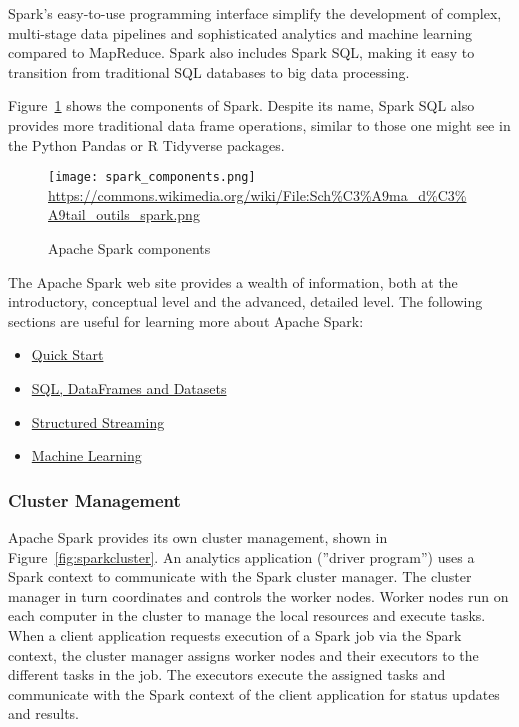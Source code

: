 Spark's easy-to-use programming interface simplify the development of complex, multi-stage data pipelines and sophisticated analytics and machine learning compared to MapReduce. Spark also includes Spark SQL, making it easy to transition from traditional SQL databases to big data processing.

Figure~\ref{fig:sparkcomponents} shows the components of Spark. Despite its name, Spark SQL also provides more traditional data frame operations, similar to those one might see in the Python Pandas or R Tidyverse packages. 

\begin{figure}
\centering

\texttt{[image: spark\_components.png]}
\scriptsize \url{https://commons.wikimedia.org/wiki/File:Sch\%C3\%A9ma_d\%C3\%A9tail_outils_spark.png} \normalsize
\caption{Apache Spark components}
\label{fig:sparkcomponents}
\end{figure}

\begin{resourcebox}
The Apache Spark web site provides a wealth of information, both at the introductory, conceptual level and the advanced, detailed level. The following sections are useful for learning more about Apache Spark:

\begin{itemize}
\item \href{https://spark.apache.org/docs/latest/quick-start.html}{Quick Start}
\item \href{https://spark.apache.org/docs/latest/sql-programming-guide.html}{SQL, DataFrames and Datasets}
\item \href{https://spark.apache.org/docs/latest/structured-streaming-programming-guide.html}{Structured Streaming}
\item \href{https://spark.apache.org/docs/latest/ml-guide.html}{Machine Learning}
\end{itemize}
\end{resourcebox}

\subsubsection*{Cluster Management}

Apache Spark provides its own cluster management, shown in Figure~\ref{fig:sparkcluster}. An analytics application (''driver program'') uses a Spark context to communicate with the Spark cluster manager. The cluster manager in turn coordinates and controls the worker nodes. Worker nodes run on each computer in the cluster to manage the local resources and execute tasks. When a client application requests execution of a Spark job via the Spark context, the cluster manager assigns worker nodes and their executors to the different tasks in the job. The executors execute the assigned tasks and communicate with the Spark context of the client application for status updates and results.

